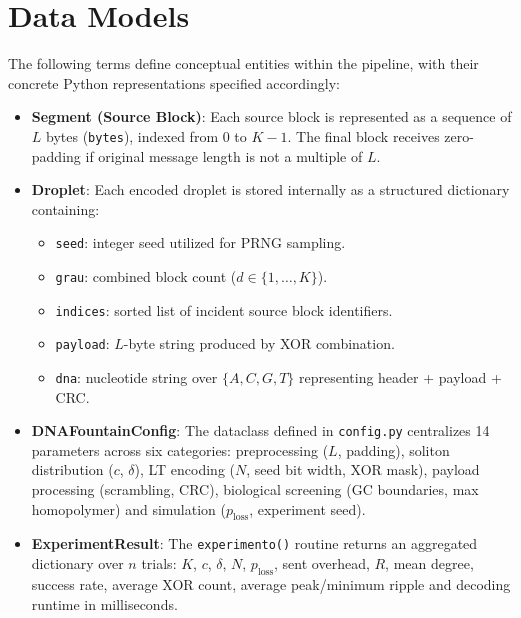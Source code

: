 \section{Data Models}
\label{sec:data_models}

The following terms define conceptual entities within the pipeline, with their concrete Python representations specified accordingly:

\begin{itemize}
    \item \textbf{Segment (Source Block)}: Each source block is represented as a sequence of $L$ bytes (\texttt{bytes}), indexed from $0$ to $K-1$. The final block receives zero-padding if original message length is not a multiple of $L$.

    \item \textbf{Droplet}: Each encoded droplet is stored internally as a structured dictionary containing:
    \begin{itemize}
        \item \texttt{seed}: integer seed utilized for PRNG sampling.
        \item \texttt{grau}: combined block count ($d \in \{1, \ldots, K\}$).
        \item \texttt{indices}: sorted list of incident source block identifiers.
        \item \texttt{payload}: $L$-byte string produced by XOR combination.
        \item \texttt{dna}: nucleotide string over $\{A, C, G, T\}$ representing header + payload + CRC.
    \end{itemize}

    \item \textbf{DNAFountainConfig}: The dataclass defined in \texttt{config.py} centralizes 14 parameters across six categories: preprocessing ($L$, padding), soliton distribution ($c$, $\delta$), LT encoding ($N$, seed bit width, XOR mask), payload processing (scrambling, CRC), biological screening (GC boundaries, max homopolymer) and simulation ($p_{\text{loss}}$, experiment seed).

    \item \textbf{ExperimentResult}: The \texttt{experimento()} routine returns an aggregated dictionary over $n$ trials: $K$, $c$, $\delta$, $N$, $p_{\text{loss}}$, sent overhead, $R$, mean degree, success rate, average XOR count, average peak/minimum ripple and decoding runtime in milliseconds.
\end{itemize}

